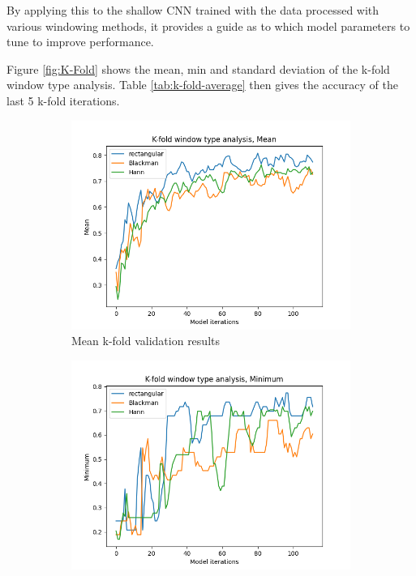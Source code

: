 \documentclass[class=report,11pt,crop=false]{standalone}
\begin{document}
By applying this to the shallow CNN trained with the data processed with various windowing methods, it provides a guide as to which model parameters to tune to improve performance. 

Figure \ref{fig:K-Fold} shows the mean, min and standard deviation of the k-fold window type analysis. Table \ref{tab:k-fold-average} then gives the accuracy of the last 5 k-fold iterations.

\begin{figure}[hbt!]
    \begin{subfigure}[b]{0.5\textwidth}
        \includegraphics[width=\linewidth]{Images/kfoldMean.png}
        \caption{Mean k-fold validation results}
        \label{fig:KMean}
    \end{subfigure}
    \hfill
    \begin{subfigure}[b]{0.5\textwidth}
        \includegraphics[width=\linewidth]{Images/kfoldMinimum.png}

\end{subfigure}
\end{figure}
\end{document}
